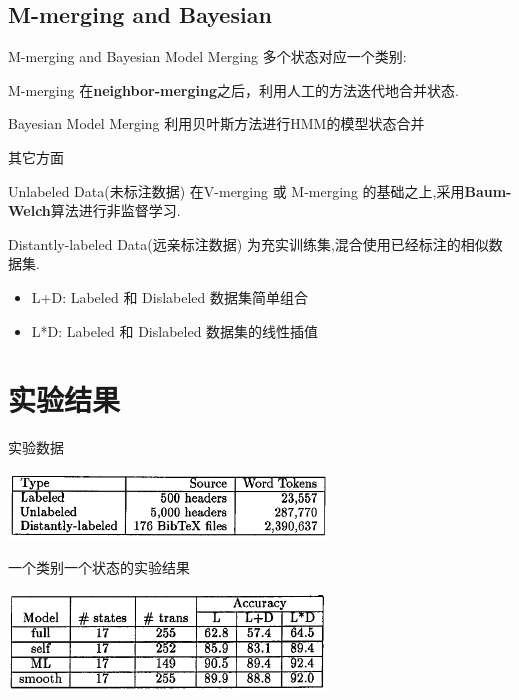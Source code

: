 \documentclass{beamer}
\begin{document}
\subsection{M-merging and Bayesian}
\begin{frame}{M-merging and Bayesian Model Merging}
多个状态对应一个类别:
            \pause
\begin{block}{M-merging}
    在\textbf{neighbor-merging}之后，利用人工的方法迭代地合并状态.    
\end{block}

            \pause
\begin{block}{Bayesian Model Merging}
    利用贝叶斯方法进行HMM的模型状态合并
\end{block}
\end{frame}

\begin{frame}{其它方面}
    \begin{block}{Unlabeled Data(未标注数据)}
        在V-merging 或 M-merging 的基础之上,采用\textbf{Baum-Welch}算法进行非监督学习. 
    \end{block}

            \pause
    \begin{block}{ Distantly-labeled Data(远亲标注数据)}
        为充实训练集,混合使用已经标注的相似数据集. 
        \begin{itemize}
            \item L+D: Labeled 和 Dislabeled 数据集简单组合
            \item L*D: Labeled 和 Dislabeled 数据集的线性插值
        \end{itemize}
    \end{block}
\end{frame}

\section{实验结果}
\begin{frame}{实验数据}
    \begin{center}
        \includegraphics[width=240pt]{report5/traing_set.png}
    \end{center}
\end{frame}

\begin{frame}{一个类别一个状态的实验结果}
    \begin{center}
        \includegraphics[width=240pt]{report5/one_state_per_class.png}
    \end{center}
\end{frame}
\end{document}
